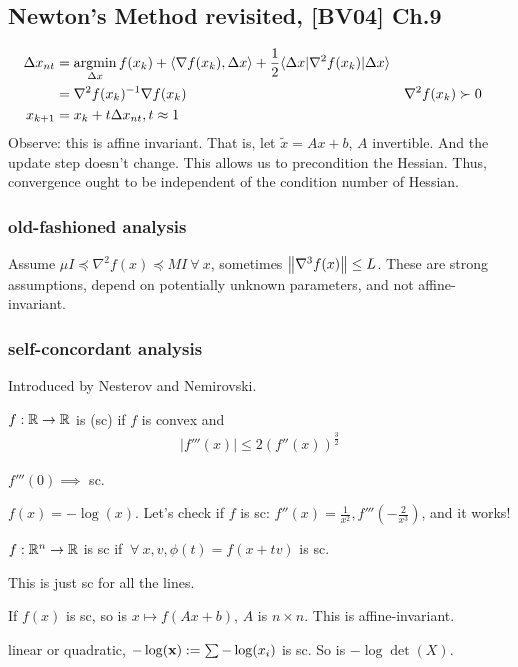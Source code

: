 \documentclass[class=article,crop=false]{standalone}
\begin{document}
\subsection{Newton's Method revisited, [BV04] Ch.9}
\begin{align*}
	\Delta x_{nt} &= \operatorname*{argmin}_{\Delta x} f(x_k) + \langle \nabla f(x_k), \Delta x \rangle + \frac{1}{2} \langle \Delta x|\nabla ^2f(x_k)|\Delta x \rangle\\
		      &= \nabla ^2 f(x_k)^{-1} \nabla f(x_k) && \nabla ^2f(x_k) \succ 0 \\
	x_{k+1} &= x_k+t \Delta x_{nt}, t\approx 1
\end{align*}
Observe: this is affine invariant. That is, let $ \widetilde{ x} = Ax+b$, $ A$ invertible. And the update step doesn't change. This allows us to precondition the Hessian. Thus, convergence ought to be independent of the condition number of Hessian.

\subsubsection{old-fashioned analysis}
Assume $ \mu I \preceq \nabla ^2f(x) \preceq MI \ \forall \ x$, sometimes $ {\left\lVert{ \nabla ^3 f(x)}\right\rVert} \leq L$. These are strong assumptions, depend on potentially unknown parameters, and not affine-invariant.
\subsubsection{self-concordant analysis}
Introduced by Nesterov and Nemirovski. 

\begin{defn}
	$ f:\mathbb{R} \to \mathbb{R}$ is  (sc) if $ f$ is convex and
	 \begin{align*}
		 |f'''(x)| \leq 2(f''(x))^{\frac{3}{2}}
	\end{align*}
\end{defn}
\begin{note}
	$ f'''(0) \implies$ sc.
\end{note}
\begin{eg}
	$ f(x) = -\log(x)$. Let's check if $ f$ is sc:  $ f''(x) = \frac{1}{x^2}, f'''(-\frac{2}{x^3})$, and it works!
\end{eg}

\begin{defn}
	$ f: \mathbb{R}^{n} \to \mathbb{R}$ is sc if $ \ \forall \ x,v, \phi(t) = f(x+tv)$ is sc.
\end{defn}
\begin{note}
This is just sc for all the lines.
\end{note}
\begin{prop}
	If $ f(x)$ is sc, so is  $ x \mapsto f(Ax+b)$, $ A$ is  $ n \times n$. This is affine-invariant.
\end{prop}
\begin{eg}
	linear or quadratic, $ -\log ({\mathbf{x}}) := \sum -\log(x_i)$ is sc. So is $ -\log \det(X)$.
\end{eg}
\end{document}
